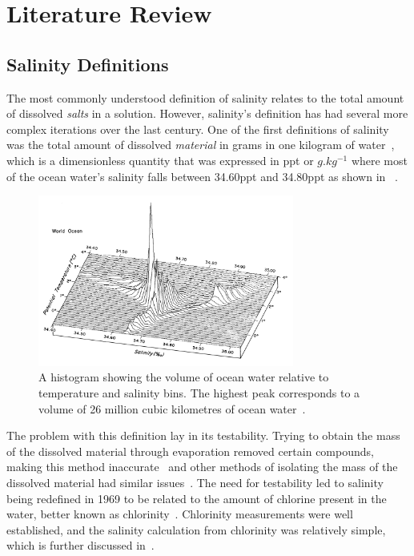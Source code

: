 
\chapter{Literature Review}\label{ch:literature}

\section{Salinity Definitions}\label{sec:a-brief-history-of-salinity}
The most commonly understood definition of salinity relates to the total amount of dissolved \textit{salts} in a solution. However, salinity's definition has had several more complex iterations over the last century.
One of the first definitions of salinity was the total amount of dissolved \textit{material} in grams in one kilogram of water~\cite{stewart_introduction_to_physical_oceanography_2004}, which is a dimensionless quantity that was expressed in \gls{ppt} or $g.kg^{-1}$ where most of the ocean water's salinity falls between 34.60\gls{ppt} and 34.80\gls{ppt} as shown in ~\cite{stewart_introduction_to_physical_oceanography_2004}.
\begin{figure}[ht]
    \centering
    \includegraphics[width=0.75\textwidth]{Figures/ocean_salinity_temperature_quantity}
    \caption{A histogram showing the volume of ocean water relative to temperature and salinity bins. The highest peak corresponds to a volume of 26 million cubic kilometres of ocean water~\cite{worthington_ocean_graphs_1981}.}
    \label{fig:ocean_salinity_temperature_quantity} %
\end{figure}\newline
The problem with this definition lay in its testability.
Trying to obtain the mass of the dissolved material through evaporation removed certain compounds, making this method inaccurate~\cite{sverdrup_ocean_physics_and_chemistry_1942} and other methods of isolating the mass of the dissolved material had similar issues~\cite{stewart_introduction_to_physical_oceanography_2004}. 
The need for testability led to salinity being redefined in 1969 to be related to the amount of chlorine present in the water, better known as chlorinity~\cite{stewart_introduction_to_physical_oceanography_2004}.
Chlorinity measurements were well established, and the salinity calculation from chlorinity was relatively simple, which is further discussed in~.

